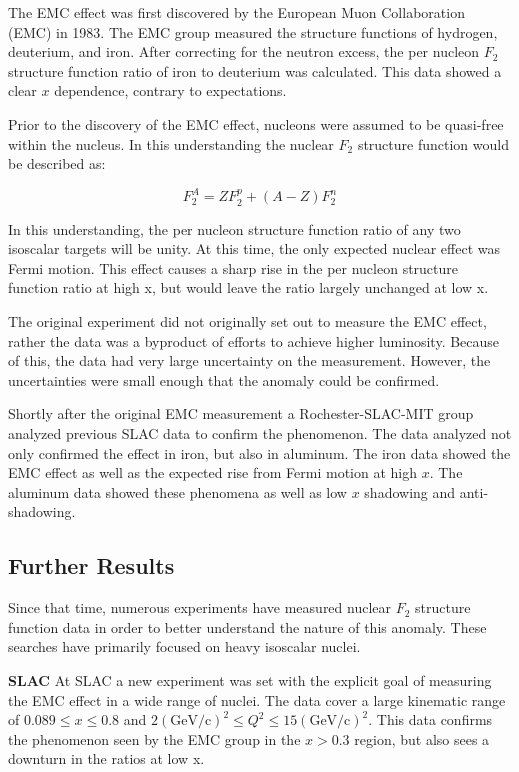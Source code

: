 The EMC effect was first discovered by the European Muon Collaboration (EMC) in 1983. The EMC group measured the structure functions of hydrogen, deuterium, and iron. After correcting for the neutron excess, the per nucleon $F_2$ structure function ratio of iron to deuterium was calculated. This data showed a clear $x$ dependence, contrary to expectations.

Prior to the discovery of the EMC effect, nucleons were assumed to be quasi-free within the nucleus. In this understanding the nuclear $F_2$ structure function would be described as:

\begin{equation}
	F_2^A = ZF_2^p + \left(A-Z\right)F_2^n
\end{equation}

In this understanding, the per nucleon structure function ratio of any two isoscalar targets will be unity. At this time, the only expected nuclear effect was Fermi motion. This effect causes a sharp rise in the per nucleon structure function ratio at high x, but would leave the ratio largely unchanged at low x.

The original experiment did not originally set out to measure the EMC effect, rather the data was a byproduct of efforts to achieve higher luminosity. Because of this, the data had very large uncertainty on the measurement. However, the uncertainties were small enough that the anomaly could be confirmed.

Shortly after the original EMC measurement a Rochester-SLAC-MIT group analyzed previous SLAC data to confirm the phenomenon. The data analyzed not only confirmed the effect in iron, but also in aluminum. The iron data showed the EMC effect as well as the expected rise from Fermi motion at high $x$. The aluminum data showed these phenomena as well as low $x$ shadowing and anti-shadowing. \cite{bodek_Fe,bodek_Al,Norton}

\subsection{Further Results}


Since that time, numerous experiments have measured nuclear $F_2$ structure function data in order to better understand the nature of this anomaly. These searches have primarily focused on heavy isoscalar nuclei.

\textbf{SLAC} At SLAC a new experiment was set with the explicit goal of measuring the EMC effect in a wide range of nuclei. The data cover a large kinematic range of $0.089 \le x \le 0.8$ and $2 \left(\textrm{GeV/c}\right)^2 \le Q^2 \le 15 \left(\textrm{GeV/c}\right)^2$. This data confirms the phenomenon seen by the EMC group in the $x>0.3$ region, but also sees a downturn in the ratios at low x. 

